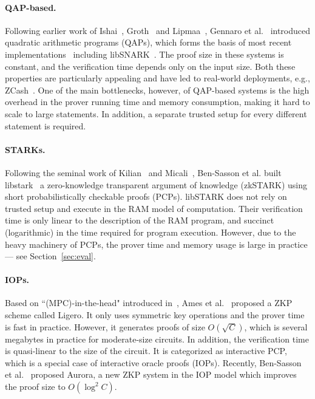 \paragraph{QAP-based.} Following earlier work of Ishai~\cite{IshaiKO07}, Groth~\cite{groth2010short} and Lipmaa~\cite{lipmaa2012progression}, Gennaro et al.~\cite{GGPR13} introduced quadratic arithmetic programs (QAPs), which forms the basis of most recent implementations~\cite{parno2013pinocchio,ben2013snarks,braun13,ben2014scalable,geppetto,DBLP:conf/eurocrypt/ChiesaTV15,wahby2015efficient,Fiore16,wu2018dizk} including \textsf{libSNARK}~\cite{libsnark}. The proof size in these systems is constant, and the verification time depends only on the input size. Both these properties are particularly appealing and have led to real-world deployments, e.g., ZCash~\cite{zerocash}. One of the main bottlenecks, however, of QAP-based systems  is the high overhead in the prover running time and memory consumption, making it hard to scale to large statements. In addition, a separate trusted setup for every different statement is required. 

\paragraph{STARKs.} Following the seminal work of Kilian~\cite{Kilian92} and Micali~\cite{Micali00}, Ben-Sasson et al. built \textsf{libstark}~\cite{libstark} a zero-knowledge transparent argument of knowledge (zkSTARK) using short probabilistically checkable proofs (PCPs). \textsf{libSTARK} does not rely on trusted setup and execute in the RAM model of computation. Their verification time is only linear to the description of the RAM program, and succinct (logarithmic) in the time required for program execution.  However, due to the heavy machinery of PCPs, the prover time and memory usage is large in practice--- see Section~\ref{sec:eval}. 

\paragraph{IOPs.} Based on ``(MPC)-in-the-head" introduced in~\cite{ishai2007zero,giacomelli2016zkboo,chase2017post}, Ames et al.~\cite{ligero} proposed a ZKP scheme called \textsf{Ligero}. It only uses symmetric key operations and the prover time is fast in practice. However, it generates proofs of size $O(\sqrt{C})$, which is several megabytes in practice for moderate-size circuits. In addition, the verification time is quasi-linear to the size of the circuit. It is categorized as interactive PCP, which is a special case of interactive oracle proofs (IOPs). Recently, Ben-Sasson et al.~\cite{aurora} proposed \textsf{Aurora}, a new ZKP system in the IOP model which improves the proof size to $O(\log^2 C)$.   


